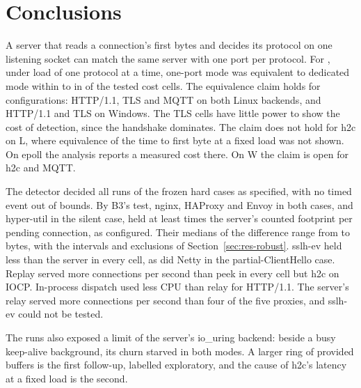 \section{Conclusions}\label{sec:conclusions}

A server that reads a connection's first bytes and decides its protocol on one listening socket can
match the same server with one port per protocol. For \oneport, under load of one protocol at a
time, one-port mode was equivalent to dedicated mode within \MarginLow{} to \MarginHigh{} in
\CostPassed{} of the \CostHolm{} tested cost cells. The equivalence claim holds for \CostClaimCount{}
configurations: HTTP/1.1, TLS and MQTT on both Linux backends, and HTTP/1.1 and TLS on Windows. The
TLS cells have little power to show the cost of detection, since the handshake dominates. The
claim does not hold for h2c on L, where equivalence of the time to first byte at a fixed load was not shown. On epoll
the analysis reports a measured cost there. On W the claim is open for h2c and MQTT.

The detector decided all \HardcaseRuns{} runs of the frozen hard cases as specified, with no timed
event out of bounds. By B3's test, nginx, HAProxy and Envoy in both cases, and hyper-util in the
silent case, held at least \FootprintMargin{} times the server's counted footprint per pending
connection, as configured. Their medians of the difference range from
\BThreeSilentHyperUtilIouringDMedian{} to \BThreePartialHelloEnvoyEpollDMedian{} bytes, with the
intervals and exclusions of Section~\ref{sec:res-robust}. sslh-ev held less than the server in
every cell, as did Netty in the partial-ClientHello case. Replay served more connections per second than peek in every cell but h2c
on IOCP. In-process dispatch used less CPU than relay for HTTP/1.1. The server's relay served more
connections per second than four of the five proxies, and sslh-ev could not be tested.

The runs also exposed a limit of the server's io\_uring backend: beside a busy keep-alive background,
its churn starved in both modes. A larger ring of provided buffers is the first follow-up, labelled
exploratory, and the cause of h2c's latency at a fixed load is the second.
